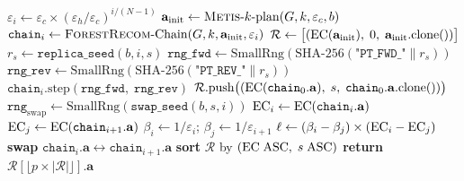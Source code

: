 \begin{algorithm}[t]
\caption{\pt{}($G$, $k$, $b$, $N$, $\varepsilon_c$, $\varepsilon_h$,
  $\mathtt{swap\_interval}$, $T$, $p$)}
\label{alg:pt}
\begin{algorithmic}[1]
\State {}
  \State $\varepsilon_i \gets \varepsilon_c \times (\varepsilon_h / \varepsilon_c)^{i/(N-1)}$
\EndFor
\State {}
\State $\mathbf{a}_{\mathrm{init}} \gets \textsc{Metis}\text{-}k\text{-}{\rm plan}(G, k, \varepsilon_c, b)$
  \State $\mathtt{chain}_i \gets \textsc{ForestRecom}\text{-}\mathrm{Chain}(G, k, \mathbf{a}_{\mathrm{init}},
    \varepsilon_i)$
\EndFor
\State $\mathcal{R} \gets \bigl[(\mathrm{EC}(\mathbf{a}_{\mathrm{init}}),\; 0,\;
  \mathbf{a}_{\mathrm{init}}.\mathrm{clone}())\bigr]$
  \State {}
    \State $r_s \gets \mathtt{replica\_seed}(b, i, s)$
    \State $\mathtt{rng\_fwd} \gets \mathrm{SmallRng}(\mathrm{SHA\text{-}256}(
      \texttt{"PT\_FWD\_"} \| r_s))$
    \State $\mathtt{rng\_rev} \gets \mathrm{SmallRng}(\mathrm{SHA\text{-}256}(
      \texttt{"PT\_REV\_"} \| r_s))$
    \State $\mathtt{chain}_i.\mathrm{step}(\mathtt{rng\_fwd},\; \mathtt{rng\_rev})$
  \EndFor
  \State $\mathcal{R}.\mathrm{push}\bigl((\mathrm{EC}(\mathtt{chain}_0.\mathbf{a}),\; s,\;
    \mathtt{chain}_0.\mathbf{a}.\mathrm{clone}())\bigr)$
  \State {}
      \State $\mathtt{rng}_{\mathrm{swap}} \gets
        \mathrm{SmallRng}(\mathtt{swap\_seed}(b, s, i))$
      \State $\mathrm{EC}_i \gets \mathrm{EC}(\mathtt{chain}_i.\mathbf{a})$
      \State $\mathrm{EC}_j \gets \mathrm{EC}(\mathtt{chain}_{i+1}.\mathbf{a})$
      \State $\beta_i \gets 1/\varepsilon_i$; \quad $\beta_j \gets 1/\varepsilon_{i+1}$
      \State $\ell \gets (\beta_i - \beta_j) \times (\mathrm{EC}_i - \mathrm{EC}_j)$
        \State \textbf{swap} $\mathtt{chain}_i.\mathbf{a} \leftrightarrow
          \mathtt{chain}_{i+1}.\mathbf{a}$
      \EndIf
    \EndFor
  \EndIf
\EndFor
\State \textbf{sort} $\mathcal{R}$ by $(\mathrm{EC} \;\mathrm{ASC},\; s \;\mathrm{ASC})$
\State \textbf{return} $\mathcal{R}[\lfloor p \times |\mathcal{R}| \rfloor].\mathbf{a}$
\end{algorithmic}
\end{algorithm}

